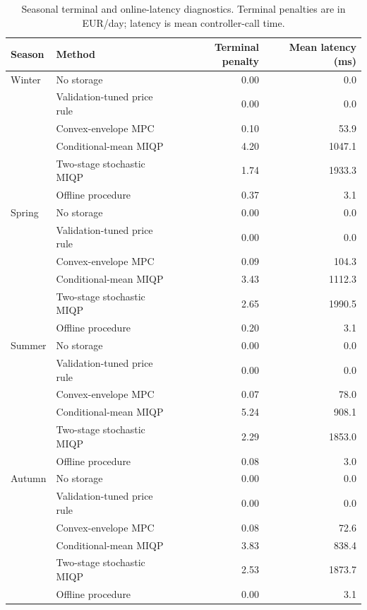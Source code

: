 \begin{table}[ht]
\centering
\small
\caption{Seasonal terminal and online-latency diagnostics. Terminal penalties are in EUR/day; latency is mean controller-call time.}
\label{tab:supp-season}
\begin{tabularx}{\linewidth}{l>{\raggedright\arraybackslash}Xrr}
\toprule
Season & Method & Terminal penalty & Mean latency (ms) \\
\midrule
Winter & No storage & 0.00 & 0.0 \\
 & Validation-tuned price rule & 0.00 & 0.0 \\
 & Convex-envelope MPC & 0.10 & 53.9 \\
 & Conditional-mean MIQP & 4.20 & 1047.1 \\
 & Two-stage stochastic MIQP & 1.74 & 1933.3 \\
 & Offline procedure & 0.37 & 3.1 \\
\addlinespace
Spring & No storage & 0.00 & 0.0 \\
 & Validation-tuned price rule & 0.00 & 0.0 \\
 & Convex-envelope MPC & 0.09 & 104.3 \\
 & Conditional-mean MIQP & 3.43 & 1112.3 \\
 & Two-stage stochastic MIQP & 2.65 & 1990.5 \\
 & Offline procedure & 0.20 & 3.1 \\
\addlinespace
Summer & No storage & 0.00 & 0.0 \\
 & Validation-tuned price rule & 0.00 & 0.0 \\
 & Convex-envelope MPC & 0.07 & 78.0 \\
 & Conditional-mean MIQP & 5.24 & 908.1 \\
 & Two-stage stochastic MIQP & 2.29 & 1853.0 \\
 & Offline procedure & 0.08 & 3.0 \\
\addlinespace
Autumn & No storage & 0.00 & 0.0 \\
 & Validation-tuned price rule & 0.00 & 0.0 \\
 & Convex-envelope MPC & 0.08 & 72.6 \\
 & Conditional-mean MIQP & 3.83 & 838.4 \\
 & Two-stage stochastic MIQP & 2.53 & 1873.7 \\
 & Offline procedure & 0.00 & 3.1 \\
\bottomrule
\end{tabularx}
\end{table}
